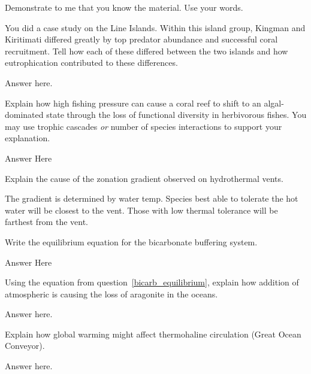 \documentclass[12pt, addpoints]{exam}
\newcommand*\AnswerBox[3]{%
    \parbox[t][#1]{0.92\textwidth}{%
    \begin{solution}#3\end{solution}}
    \vspace*{\stretch{#2}}
}
\begin{document}
\noindent Demonstrate to me that you know the material. Use your words. 


\begin{questions}

%
\question[10]
You did a case study on the Line Islands. Within this island group, 
Kingman and Kiritimati differed greatly by top predator abundance 
and successful coral recruitment. Tell how each of these differed 
between the two islands and how eutrophication contributed to these 
differences.

\AnswerBox{0.3\textheight}{1}{%
Answer here.}




\question[10]
Explain how high fishing pressure can cause a coral reef to shift to 
an algal-dominated state through the loss of functional diversity
in herbivorous fishes. You may use trophic cascades \emph{or} number
of species interactions to support your explanation.

\AnswerBox{0.3\textheight}{1}{%
	Answer Here
}

%
\newpage

%
\question[5]
Explain the cause of the zonation gradient observed on hydrothermal vents.
 
\AnswerBox{0.1\textheight}{0.5}{%
	The gradient is determined by water temp. Species best able to tolerate
	the hot water will be closest to the vent. Those with low thermal
	tolerance will be farthest from the vent.
}

\question[5]\label{bicarb_equilibrium}
Write the equilibrium equation for the bicarbonate buffering system.

\AnswerBox{0.1\textheight}{0.5}{%
Answer Here
}

\question[5] Using the equation from question~\ref{bicarb_equilibrium}, 
explain how addition of atmospheric  is causing the loss of 
aragonite in the oceans.

\AnswerBox{0.2\textheight}{3}{%
Answer here.}

\question[5] 
Explain how global warming might affect thermohaline circulation (Great Ocean Conveyor).

\AnswerBox{0.2\textheight}{3}{%
Answer here.}


\newpage

%
%


\end{questions}
\end{document}
